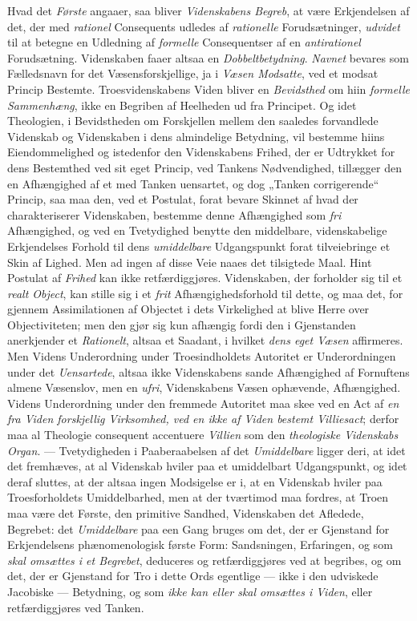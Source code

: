 \documentclass[12pt,a4paper]{book}
\newcommand{\opage}[1]{\marginnote{\footnotesize\textit{[#1]}}}
\begin{document}
Hvad det \emph{Første} angaaer, saa bliver \emph{Videnskabens Begreb}, at være Erkjendelsen af det, der
med \emph{rationel} Consequents udledes af \emph{rationelle} Forudsætninger, \emph{udvidet} til at betegne en
Udledning af \emph{formelle} Consequentser af en \emph{antirationel} Forudsætning. Videnskaben faaer altsaa en \emph{Dobbeltbetydning}. \emph{Navnet} bevares som Fælledsnavn for det Væsensforskjellige, ja i \emph{Væsen Modsatte}, ved et modsat Princip Bestemte.
Troesvidenskabens Viden bliver en \emph{Bevidsthed} om hiin \opage{115}\emph{formelle Sammenhæng}, ikke en Begriben af Heelheden ud fra Principet. Og idet Theologien, i Bevidstheden om Forskjellen
mellem den saaledes forvandlede Videnskab og Videnskaben i dens almindelige Betydning, vil
bestemme hiins Eiendommelighed og istedenfor den Videnskabens Frihed, der er Udtrykket for
dens Bestemthed ved sit eget Princip, ved Tankens Nødvendighed, tillægger den en
Afhængighed af et med Tanken uensartet, og dog „Tanken corrigerende“ Princip, saa maa den,
ved et Postulat, forat bevare Skinnet af hvad der charakteriserer Videnskaben, bestemme
denne Afhængighed som \emph{fri} Afhængighed, og ved en Tvetydighed benytte den middelbare,
videnskabelige Erkjendelses Forhold til dens \emph{umiddelbare} Udgangspunkt forat tilveiebringe
et Skin af Lighed. Men ad ingen af disse Veie naaes det tilsigtede Maal. Hint Postulat af \emph{Frihed} kan ikke retfærdiggjøres. Videnskaben, der forholder sig til et \emph{realt Object},
kan stille sig i et \emph{frit} Afhængighedsforhold til dette, og maa det, for gjennem
Assimilationen af Objectet i dets Virkelighed at blive Herre over Objectiviteten; men den
gjør sig kun afhængig fordi den i Gjenstanden anerkjender et \emph{Rationelt}, altsaa et
Saadant, i hvilket \emph{dens eget Væsen} affirmeres. Men Videns Underordning under
Troesindholdets Autoritet er Underordningen under det \emph{Uensartede}, altsaa ikke Videnskabens
sande Afhængighed af Fornuftens almene Væsenslov, men en \emph{ufri}, Videnskabens Væsen
ophævende, Afhængighed. Videns Underordning under den fremmede Autoritet maa skee ved en Act af \emph{en fra Viden forskjellig Virksomhed, ved en ikke af Viden bestemt Villiesact};
derfor maa al Theologie consequent accentuere \emph{Villien} som den \emph{theologiske Videnskabs Organ}.
--- Tvetydigheden i Paaberaabelsen af det \emph{Umiddelbare} ligger deri, at idet det fremhæves,
at al Videnskab hviler paa et umiddelbart Udgangspunkt, og idet deraf sluttes, at der
altsaa ingen Modsigelse er i, at en Videnskab hviler paa Troesforholdets Umiddelbarhed, men
at der tværtimod maa fordres, at Troen maa være det Første, den primitive Sandhed,
Videnskaben det \opage{116}Afledede, Begrebet: det \emph{Umiddelbare} paa een Gang bruges om det, der er
Gjenstand for Erkjendelsens phænomenologisk første Form: Sandsningen, Erfaringen, og som
\emph{skal omsættes i et Begrebet}, deduceres og retfærdiggjøres ved at begribes, og om det, der
er Gjenstand for Tro i dette Ords egentlige --- ikke i den udviskede Jacobiske ---
Betydning, og som \emph{ikke kan eller skal omsættes i Viden}, eller retfærdiggjøres ved Tanken.
\end{document}

